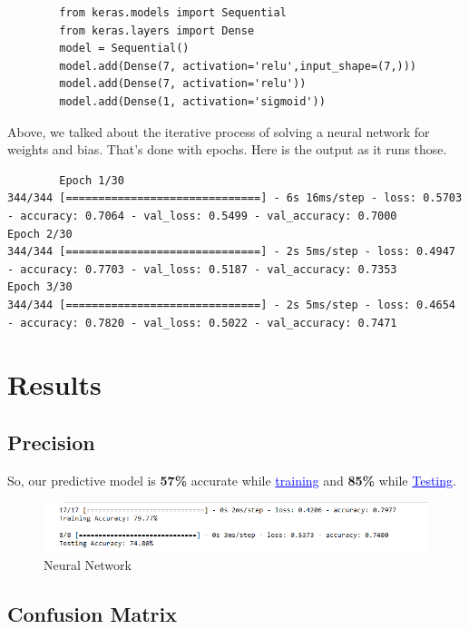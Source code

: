     \begin{lstlisting}
        from keras.models import Sequential
        from keras.layers import Dense
        model = Sequential()
        model.add(Dense(7, activation='relu',input_shape=(7,)))
        model.add(Dense(7, activation='relu'))
        model.add(Dense(1, activation='sigmoid'))   
    \end{lstlisting}
    Above, we talked about the iterative process of solving a neural network for weights and bias.
     That’s done with epochs. Here is the output as it runs those.    
     \begin{lstlisting}
        Epoch 1/30
344/344 [==============================] - 6s 16ms/step - loss: 0.5703 - accuracy: 0.7064 - val_loss: 0.5499 - val_accuracy: 0.7000
Epoch 2/30
344/344 [==============================] - 2s 5ms/step - loss: 0.4947 - accuracy: 0.7703 - val_loss: 0.5187 - val_accuracy: 0.7353
Epoch 3/30
344/344 [==============================] - 2s 5ms/step - loss: 0.4654 - accuracy: 0.7820 - val_loss: 0.5022 - val_accuracy: 0.7471    
    \end{lstlisting}
    

\section{Results}
\label{chap:results}

\subsection{Precision}
\label{sec:Precision}

So, our predictive model is \textbf{57\% } accurate while \textcolor{blue}{\underline{training}} and \textbf{85\% } while \textcolor{blue}{\underline {Testing}}.

\begin{figure}[htp]
    \centering
    \includegraphics[width=1.1\textwidth]{images/accuracy.png}
    \caption{Neural Network }
    \label{fig:example4}
\end{figure}

\subsection{Confusion Matrix}
\label{sec:Confusion Matrix}

